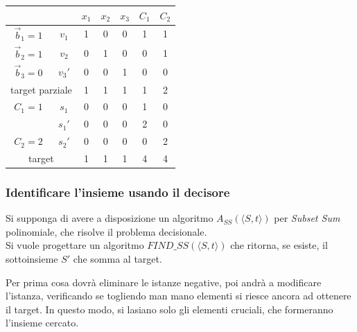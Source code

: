 \begin{center}
    \begin{tabular}[h]{cc|ccc|cc}
                         &        & $x_1$ & $x_2$ & $x_3$ & $C_1$ & $C_2$ \\
        \hline
        $\vec{b}_1 = 1 $ & $v_1$  & 1 & 0 & 0 & 1 & 1 \\
        $\vec{b}_2 = 1 $ & $v_2$  & 0 & 1 & 0 & 0 & 1 \\
        $\vec{b}_3 = 0 $ & $v_3'$ & 0 & 0 & 1 & 0 & 0 \\
        \hline
        \multicolumn{2}{c}{target parziale}  & 1 & 1 & 1 & 1 & 2 \\
        \hline
        $C_1 = 1$ & $s_1$  & 0 & 0 & 0 & 1 & 0 \\
                  & $s_1'$ & 0 & 0 & 0 & 2 & 0 \\
        $C_2 = 2$ & $s_2'$ & 0 & 0 & 0 & 0 & 2 \\
        \hline
        \multicolumn{2}{c}{target} & 1 & 1 & 1 & 4 & 4 \\
    \end{tabular}
\end{center}

\subsubsection{Identificare l'insieme usando il decisore}

Si supponga di avere a disposizione un algoritmo $
A_{SS} ( \langle S, t \rangle )
$ per \emph{Subset Sum} polinomiale, che risolve il problema decisionale.
\\
Si vuole progettare un algoritmo $
FIND\_SS  ( \langle S, t \rangle )
$ che ritorna, se esiste, il sottoinsieme $S'$ che somma al target.

Per prima cosa dovrà eliminare le istanze negative, poi andrà a modificare l'istanza, verificando se togliendo man mano elementi si riesce ancora ad ottenere il target. In questo modo, si lasiano solo gli elementi cruciali, che formeranno l'insieme cercato.

